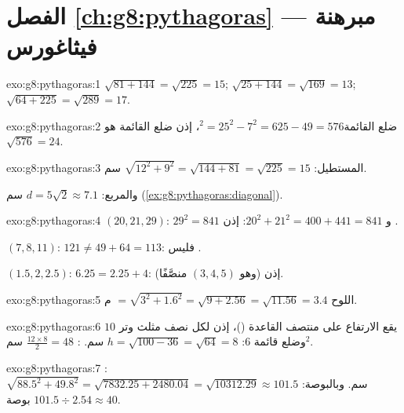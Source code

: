 \section*{الفصل \ref{ch:g8:pythagoras} --- مبرهنة فيثاغورس}

\begin{solution}{exo:g8:pythagoras:1}
$\sqrt{81 + 144} = \sqrt{225} = 15$; \quad
$\sqrt{25 + 144} = \sqrt{169} = 13$; \quad
$\sqrt{64 + 225} = \sqrt{289} = 17$.
\end{solution}

\begin{solution}{exo:g8:pythagoras:2}
ضلع القائمة$^2 = 25^2 - 7^2 = 625 - 49 = 576$، إذن ضلع القائمة هو
$\sqrt{576} = 24$.
\end{solution}

\begin{solution}{exo:g8:pythagoras:3}
المستطيل: $\sqrt{12^2 + 9^2} = \sqrt{144 + 81} = \sqrt{225} = 15$
سم.

والمربع: $d = 5\sqrt2 \approx 7.1$ سم
(\cref{ex:g8:pythagoras:diagonal}).
\end{solution}

\begin{solution}{exo:g8:pythagoras:4}
$(20, 21, 29)$: $29^2 = 841$ و $20^2 + 21^2 = 400 + 441 = 841$:
إذن .

$(7, 8, 11)$: $121 \neq 49 + 64 = 113$: فليس .

$(1.5, 2, 2.5)$: $6.25 = 2.25 + 4$: إذن  (وهو
$(3,4,5)$ منصَّفًا).
\end{solution}

\begin{solution}{exo:g8:pythagoras:5}
اللوح $= \sqrt{3^2 + 1.6^2} = \sqrt{9 + 2.56} = \sqrt{11.56} = 3.4$
م.
\end{solution}

\begin{solution}{exo:g8:pythagoras:6}
يقع الارتفاع على منتصف القاعدة ()، إذن
لكل نصف مثلث وتر $10$ وضلع قائمة $6$:
$h = \sqrt{100 - 36} = \sqrt{64} = 8$ سم. :
$\frac{12 \times 8}{2} = 48$ سم$^2$.
\end{solution}

\begin{solution}{exo:g8:pythagoras:7}
: $\sqrt{88.5^2 + 49.8^2} = \sqrt{7832.25 + 2480.04}
= \sqrt{10312.29} \approx 101.5$ سم. وبالبوصة:
$101.5 \div 2.54 \approx 40$ بوصة.
\end{solution}

